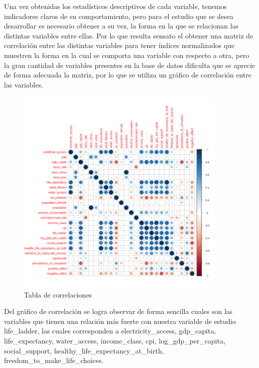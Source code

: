 \newpage






Una vez obtenidas los estadísticos descriptivos de cada variable, tenemos indicadores claros de su comportamiento, pero para el estudio que se desea desarrollar es necesario obtener a su vez, la forma en la que se relacionan las distintas variables entre ellas. Por lo que resulta sensato el obtener una matriz de correlación entre las distintas variables para tener índices normalizados que muestren la forma en la cual se comporta una variable con respecto a otra, pero la gran cantidad de variables presentes en la base de datos dificulta que se aprecie de forma adecuada la matriz, por lo que se utiliza un gráfico de correlación entre las variables.



\begin{figure}[!ht]
    \centering
    \includegraphics[width=0.9\textwidth]{figures/correlaciones.png}
    \caption{Tabla de correlaciones}
    \label{fig:correlaciones}
\end{figure}

\newpage

Del gráfico de correlación se logra observar de forma sencilla cuales son las variables que tienen una relación más fuerte con nuestra variable de estudio life\_ladder, las cuales corresponden a electricity\_access, gdp\_capita, life\_expectancy, water\_access, income\_class, cpi, log\_gdp\_per\_capita, social\_support, healthy\_life\_expectancy\_at\_birth, freedom\_to\_make\_life\_choices.

